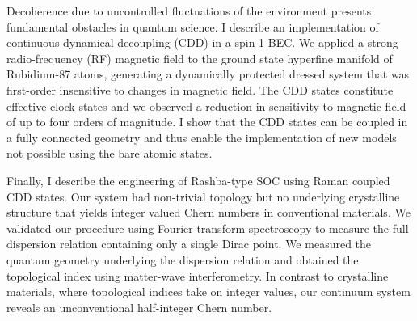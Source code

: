 Decoherence due to uncontrolled fluctuations of the environment presents fundamental obstacles in quantum science. I describe an implementation of continuous dynamical decoupling (CDD) in a spin-1 BEC. We applied a strong radio-frequency (RF) magnetic field to the ground state hyperfine manifold of Rubidium-87 atoms, generating a dynamically protected dressed system that was first-order insensitive to changes in magnetic field. The CDD states constitute effective clock states and we observed a reduction in sensitivity to magnetic field of up to four orders of magnitude. I show that the CDD states can be coupled in a fully connected geometry and thus enable the implementation of new models not possible using the bare atomic states. 

Finally, I describe the engineering of Rashba-type SOC using Raman coupled CDD states. Our system had non-trivial topology but no underlying crystalline structure that yields integer valued Chern numbers in conventional materials. We validated our procedure using Fourier transform spectroscopy to measure the full dispersion relation containing only a single Dirac point. We measured the quantum geometry underlying the dispersion relation and obtained the topological index using matter-wave interferometry. In contrast to crystalline materials, where topological indices take on integer values, our continuum system reveals an unconventional half-integer Chern number. 

